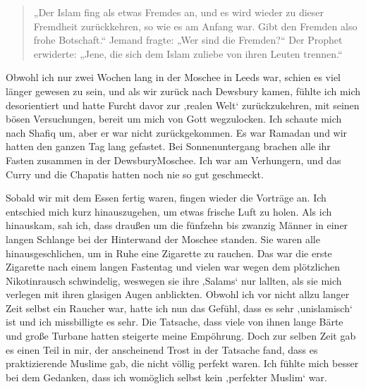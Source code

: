 \documentclass[12pt]{memoir}
\begin{document}
\begin{quote}
„Der Islam fing als etwas Fremdes an,
und es wird wieder zu dieser Fremdheit zurückkehren,
so wie es am Anfang war.
Gibt den Fremden also frohe Botschaft.“
Jemand fragte: „Wer sind die Fremden?“
Der Prophet erwiderte:
„Jene, die sich dem Islam zuliebe von ihren Leuten trennen.“
\end{quote}

Obwohl ich nur zwei Wochen lang in der Moschee in Leeds war,
schien es viel länger gewesen zu sein, und als wir zurück nach Dewsbury kamen,
fühlte ich mich desorientiert und hatte Furcht davor
zur ‚realen Welt‘ zurückzukehren, mit seinen bösen Versuchungen,
bereit um mich von Gott wegzulocken.
Ich schaute mich nach Shafiq um, aber er war nicht zurückgekommen.
Es war Ramadan und wir hatten den ganzen Tag lang gefastet.
Bei Sonnenuntergang brachen alle ihr Fasten zusammen in der Dewsbury\–Moschee.
Ich war am Verhungern, und das Curry
und die Chapatis hatten noch nie so gut geschmeckt.

Sobald wir mit dem Essen fertig waren, fingen wieder die Vorträge an.
Ich entschied mich kurz hinauszugehen, um etwas frische Luft zu holen.
Als ich hinauskam, sah ich, dass draußen um die fünfzehn bis zwanzig Männer
in einer langen Schlange bei der Hinterwand der Moschee standen.
Sie waren alle hinausgeschlichen, um in Ruhe eine Zigarette zu rauchen.
Das war die erste Zigarette nach einem langen Fastentag
und vielen war wegen dem plötzlichen Nikotinrausch schwindelig,
weswegen sie ihre ‚Salams‘ nur lallten,
als sie mich verlegen mit ihren glasigen Augen anblickten.
Obwohl ich vor nicht allzu langer Zeit selbst ein Raucher war,
hatte ich nun das Gefühl, dass es sehr ‚unislamisch‘ ist
und ich missbilligte es sehr.
Die Tatsache, dass viele von ihnen lange Bärte
und große Turbane hatten steigerte meine Empöhrung.
Doch zur selben Zeit gab es einen Teil in mir,
der anscheinend Trost in der Tatsache fand,
dass es praktizierende Muslime gab, die nicht völlig perfekt waren.
Ich fühlte mich besser bei dem Gedanken,
dass ich womöglich selbst kein ‚perfekter Muslim‘ war.
\end{document}
